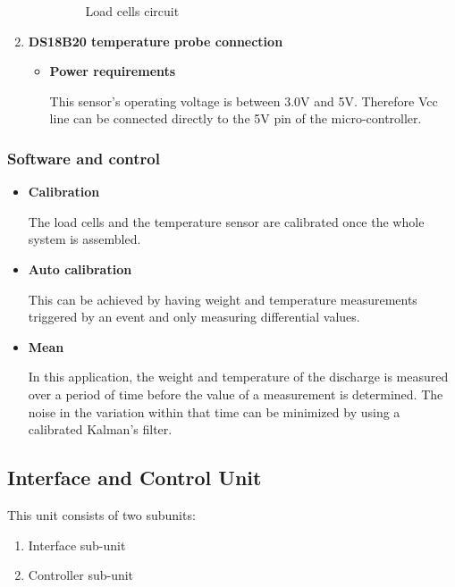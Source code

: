 \begin{enumerate}
\begin{itemize}
\begin{figure}[H]
            \caption[Load cells circuit]{Load cells circuit \cite{loadcell}}
            \label{fig:load_cell_circuit}
        \end{figure}
    \end{itemize}
    \item \textbf{DS18B20 temperature probe connection}
    \par
    \begin{itemize}
        \item \textbf{Power requirements}
        \par
        This sensor's operating voltage is between 3.0V and 5V. Therefore Vcc line can be connected directly to the 5V pin of the micro-controller.
    \end{itemize}
\end{enumerate}
\subsubsection{Software and control}
\begin{itemize}
    \item \textbf{Calibration}
    \par
    The load cells and the temperature sensor are calibrated once the whole system is assembled.
    \item \textbf{Auto calibration}
    \par 
    This can be achieved by having weight and temperature measurements triggered by an event and only measuring differential values.
    \item \textbf{Mean}
    \par
    In this application, the weight and temperature of the discharge is measured over a period of time before the value of a measurement is determined. The noise in the variation within that time can be minimized by using a calibrated Kalman's filter.
\end{itemize}

\subsection{Interface and Control Unit}
This unit consists of two subunits:
\begin{enumerate}
    \item Interface sub-unit
    \item Controller sub-unit
\end{enumerate}

